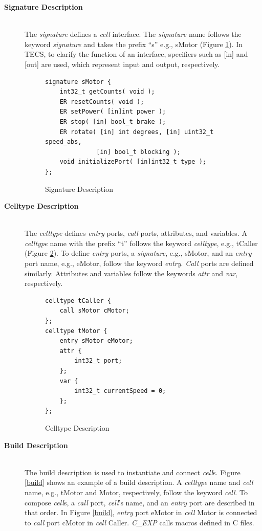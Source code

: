 \documentclass[S,R,E]{article/compsoft}
\begin{document}
\begin{description}
    \item[{\bf Signature Description}]\mbox{}\\
        The {\it signature} defines a {\it cell} interface.
        The {\it signature} name follows the keyword {\it signature} and takes the prefix ``s'' e.g., sMotor (Figure \ref{signature}).
        In TECS, to clarify the function of an interface, specifiers such as [in] and [out] are used, which represent input and output, respectively.
\begin{figure}[t]
\centering
\begin{lstlisting}
signature sMotor {
    int32_t getCounts( void );
    ER resetCounts( void );
    ER setPower( [in]int power );
    ER stop( [in] bool_t brake );
    ER rotate( [in] int degrees, [in] uint32_t speed_abs,
              [in] bool_t blocking );
    void initializePort( [in]int32_t type );
};
\end{lstlisting}
\caption{Signature Description}
\label{signature}
\end{figure}
    \item[{\bf Celltype Description}]\mbox{}\\
        The {\it celltype} defines {\it entry} ports, {\it call} ports, attributes, and variables.
        A {\it celltype} name with the prefix ``t'' follows the keyword {\it celltype}, e.g., tCaller (Figure \ref{celltype}).
        To define {\it entry} ports, a {\it signature}, e.g., sMotor, and an {\it entry} port name, e.g., eMotor, follow the keyword {\it entry}.
        {\it Call} ports are defined similarly.
        Attributes and variables follow the keywords {\it attr} and {\it var}, respectively.
\begin{figure}[t]
\centering
\begin{lstlisting}
celltype tCaller {
    call sMotor cMotor;
};
celltype tMotor {
    entry sMotor eMotor;
    attr {
        int32_t port;
    };
    var {
        int32_t currentSpeed = 0;
    };
};
\end{lstlisting}
\caption{Celltype Description}
\label{celltype}
\end{figure}
    \item[{\bf Build Description}]\mbox{}\\
        The build description is used to instantiate and connect {\it cell}s.
        Figure \ref{build} shows an example of a build description.
        A {\it celltype} name and {\it cell} name, e.g., tMotor and Motor, respectively, follow the keyword {\it cell}.
        To compose {\it cell}s, a {\it call} port, {\it cell}'s name, and an {\it entry} port are described in that order.
        In Figure \ref{build}, {\it entry} port eMotor in {\it cell} Motor is connected to {\it call} port cMotor in {\it cell} Caller.
        {\it C\_EXP} calls macros defined in C files.


\end{description}
\end{document}
